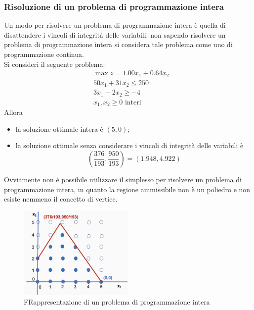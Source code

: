 \documentclass[a4paper]{extarticle}
\begin{document}
\vspace{1em}
\subsubsection{Risoluzione di un problema di programmazione intera}
Un modo per risolvere un problema di programmazione intera è quella di disattendere i vincoli di integrità delle variabili: non sapendo risolvere un problema di programmazione intera si considera tale problema come uno di programmazione continua.\\
Si consideri il seguente problema:
\begin{align*}
    &\max z = 1.00x_1 + 0.64x_2\\
    &50x_1 + 31x_2 \leq 250\\
    &3x_1 - 2x_2 \geq -4\\
    &x_1, x_2 \geq 0 \text{ interi}
\end{align*}
Allora
\begin{itemize}
    \item la soluzione ottimale intera è $(5,0)$;
    \item la soluzione ottimale senza considerare i vincoli di integrità delle variabili è
    \[\left(\dfrac{376}{193}, \dfrac{950}{193}\right) = (1.948, 4.922)\]
\end{itemize}
Ovviamente non è possibile utilizzare il simplesso per risolvere un problema di programmazione intera, in quanto la regione ammissibile non è un poliedro e non esiste nemmeno il concetto di vertice.

\begin{figure}[H]
    \centering
    \includegraphics[width=0.5\textwidth]{problema-programmazione-intera.png}
    \caption{FRappresentazione di un problema di programmazione intera}
    \label{fig:fig2}
\end{figure}
\end{document}

